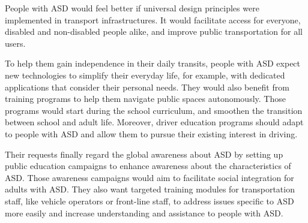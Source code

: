 People with ASD would feel better if universal design principles were implemented in transport infrastructures\cite{2020ExperiencesYoungAutistic}. It would facilitate access for everyone, disabled and non-disabled people alike, and improve public transportation for all users.

To help them gain independence in their daily transits, people with ASD expect new technologies to simplify their everyday life, for example, with dedicated applications that consider their personal needs. They would also benefit from training programs to help them navigate public spaces autonomously. Those programs would start during the school curriculum, and smoothen the transition between school and adult life\cite{2015DetourRightPlace}. Moreover, driver education programs should adapt to people with ASD and allow them to pursue their existing interest in driving\cite{2015DetourRightPlace}. 

Their requests finally regard the global awareness about ASD by setting up public education campaigns to enhance awareness about the characteristics of ASD. Those awareness campaigns would aim to facilitate social integration for adults with ASD\cite{2015DetourRightPlace}. They also want targeted training modules for transportation staff, like vehicle operators or front-line staff, to address issues specific to ASD more easily and increase understanding and assistance to people with ASD\cite{2020ExperiencesYoungAutistic}. 
